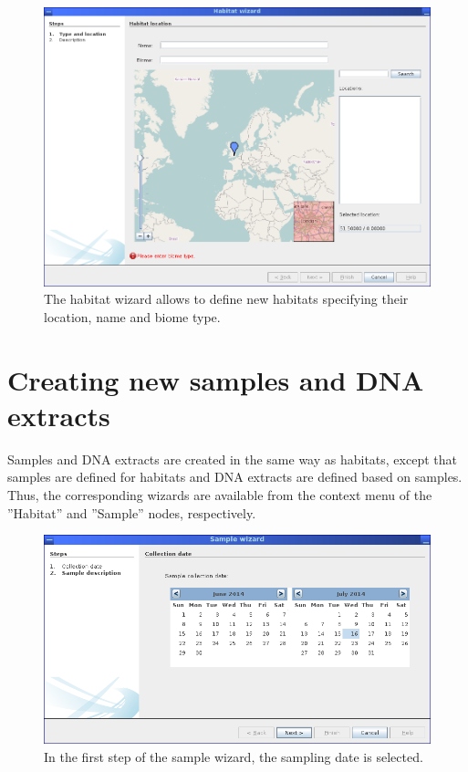 \begin{figure}[H]
\centering
\includegraphics[width=.8\textwidth]{img/mgx/habwizard}
\caption[Habitat wizard]{The habitat wizard allows to define new habitats specifying their location, name and
biome type.}
\label{habwiz}
\end{figure}

\section{Creating new samples and DNA extracts}

Samples and DNA extracts are created in the same way as habitats, except that samples are defined for
habitats and DNA extracts are defined based on samples. Thus, the corresponding wizards are available
from the context menu of the ''Habitat'' and ''Sample'' nodes, respectively.

\begin{figure}[H]
\centering
\includegraphics[width=.8\textwidth]{img/mgx/samplewiz1}
\caption[Sample wizard]{In the first step of the sample wizard, the sampling date is selected.}
\label{samplewiz1}
\end{figure}

